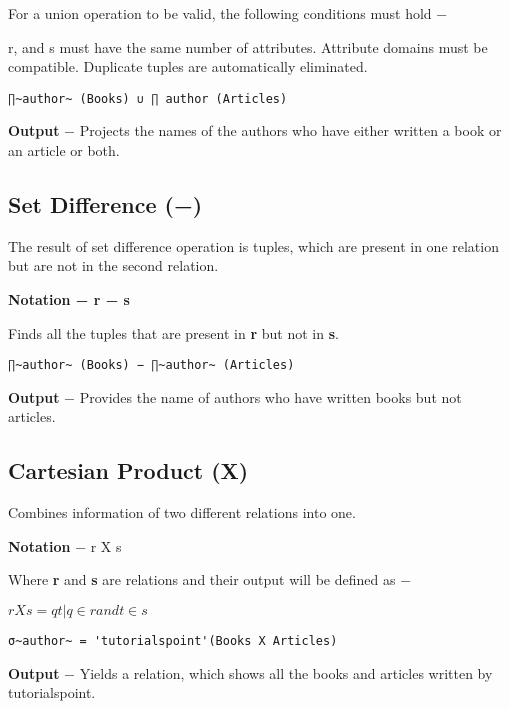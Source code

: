 \documentclass[]{article}
\begin{document}
For a union operation to be valid, the following conditions must hold −

r, and s must have the same number of attributes. Attribute domains must
be compatible. Duplicate tuples are automatically eliminated.

\begin{verbatim}
∏~author~ (Books) ∪ ∏ author (Articles)
\end{verbatim}

\textbf{Output} − Projects the names of the authors who have either
written a book or an article or both.

\hypertarget{set-difference}{%
\subsection{Set Difference (−)}\label{set-difference}}

The result of set difference operation is tuples, which are present in
one relation but are not in the second relation.

\textbf{Notation − r − s}

Finds all the tuples that are present in \textbf{r} but not in
\textbf{s}.

\begin{verbatim}
∏~author~ (Books) − ∏~author~ (Articles)
\end{verbatim}

\textbf{Output} − Provides the name of authors who have written books
but not articles.

\hypertarget{cartesian-product-ux3c7}{%
\subsection{Cartesian Product (Χ)}\label{cartesian-product-ux3c7}}

Combines information of two different relations into one.

\textbf{Notation} − r Χ s

Where \textbf{r} and \textbf{s} are relations and their output will be
defined as −

\(r Χ s = { q t | q ∈ r and t ∈ s}\)

\begin{verbatim}
σ~author~ = 'tutorialspoint'(Books Χ Articles)
\end{verbatim}

\textbf{Output} − Yields a relation, which shows all the books and
articles written by tutorialspoint.
\end{document}
